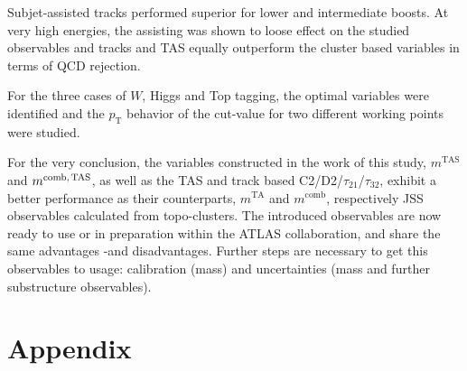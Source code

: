 \documentclass[UKenglish,texlive=2013]{\ATLASLATEXPATH atlasdoc}
\newcommand{\mta}{\ensuremath{m^\textrm{TA}}\xspace}
\newcommand{\mtas}{\ensuremath{m^\textrm{TAS}}\xspace}
\newcommand{\mcomb}{\ensuremath{m^\textrm{comb}}\xspace}
\newcommand{\mcombtas}{\ensuremath{m^\textrm{comb,\,TAS}}\xspace}
\begin{document}
Subjet-assisted tracks performed superior for lower and intermediate boosts. At very high energies, the assisting was shown to loose effect on the studied observables and tracks and TAS equally outperform the cluster based variables in terms of QCD rejection.

For the three cases of $W$, Higgs and Top tagging, the optimal variables were identified and the $p_{\text{T}}$ behavior of the cut-value for two different working points were studied. 


For the very conclusion, the variables constructed in the work of this study, $\mtas$ and $\mcombtas$, as well as the TAS and track based C2/D2/$\tau_{21}$/$\tau_{32}$, exhibit a better performance as their counterparts, $\mta$ and $\mcomb$, respectively JSS observables calculated from topo-clusters. The introduced observables are now ready to use or in preparation within the ATLAS collaboration, and share the same advantages -and disadvantages. Further steps are necessary to get this observables to usage: calibration (mass) and uncertainties (mass and further substructure observables).

\clearpage
\appendix
\part*{Appendix}





\end{document}
